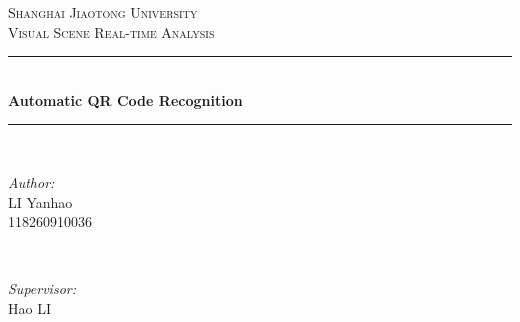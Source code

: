 \documentclass[10pt]{article}
\begin{document}
\begin{titlepage}

\newcommand{\HRule}{\rule{\linewidth}{0.5mm}} %

\center %


\textsc{\LARGE Shanghai Jiaotong University}\\[1.5cm] %
\textsc{\Large Visual Scene Real-time Analysis}\\[0.5cm] %


\HRule \\[0.4cm]
{ \huge \bfseries Automatic QR Code Recognition}\\[0.4cm] %
\HRule \\[1.5cm]


\begin{minipage}{0.4\textwidth}
\begin{flushleft} \large
\emph{Author:}\\
LI Yanhao \\118260910036\\
\end{flushleft}
\end{minipage}
~
\begin{minipage}{0.4\textwidth}
\begin{flushright} \large
\emph{Supervisor:} \\
Hao  \textsc{LI} \\%
\end{flushright}
\end{minipage}\\[2cm]


\end{titlepage}
\end{document}
